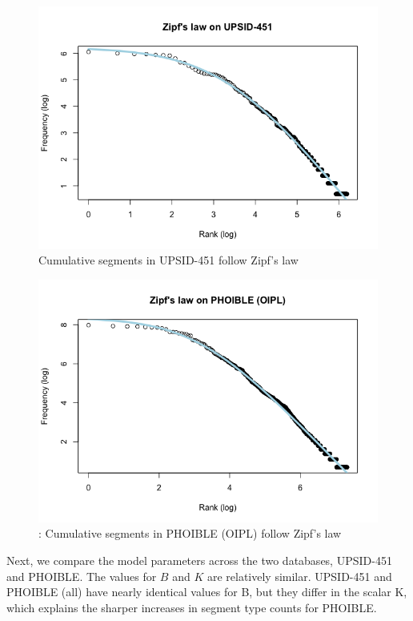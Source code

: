 \documentclass[
]{article}
\begin{document}
\begin{figure}

{\centering \includegraphics[width=0.8\linewidth]{README_files/figure-gfm/zipf_distribution_upsid-1} 

}

\caption{\label{fig:upsid}Cumulative segments in UPSID-451 follow Zipf's law}\label{fig:upsid_heaps}
\end{figure}

\begin{figure}

{\centering \includegraphics[width=0.8\linewidth]{README_files/figure-gfm/zipf_distribution_phoible-1} 

}

\caption{\label{fig:upsid}: Cumulative segments in PHOIBLE (OIPL) follow Zipf's law}\label{fig:phoible_heaps}
\end{figure}

Next, we compare the model parameters across the two databases,
UPSID-451 and PHOIBLE. The values for \(B\) and \(K\) are relatively
similar. UPSID-451 and PHOIBLE (all) have nearly identical values for B,
but they differ in the scalar K, which explains the sharper increases in
segment type counts for PHOIBLE.
\end{document}
